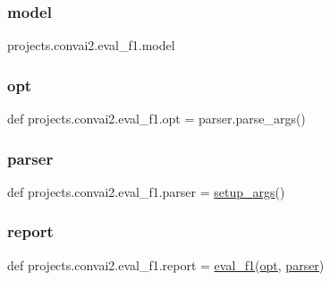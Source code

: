 \subsubsection{\texorpdfstring{model}{model}}
{\footnotesize\ttfamily projects.\+convai2.\+eval\+\_\+f1.\+model}

\mbox{\label{namespaceprojects_1_1convai2_1_1eval__f1_a57ea0872105b4863c523331ade8a705e}} 
\subsubsection{\texorpdfstring{opt}{opt}}
{\footnotesize\ttfamily def projects.\+convai2.\+eval\+\_\+f1.\+opt = parser.\+parse\+\_\+args()}

\mbox{\label{namespaceprojects_1_1convai2_1_1eval__f1_a6da11294e7d2ac208d4069e4b4edfe72}} 
\subsubsection{\texorpdfstring{parser}{parser}}
{\footnotesize\ttfamily def projects.\+convai2.\+eval\+\_\+f1.\+parser = \hyperlink{namespaceprojects_1_1convai2_1_1eval__f1_a74826f78ce1ce6c9fe9b6d4a6297f3bd}{setup\+\_\+args}()}

\mbox{\label{namespaceprojects_1_1convai2_1_1eval__f1_ac8a7730e4bd30a9a12a7f83c3b6821fd}} 
\subsubsection{\texorpdfstring{report}{report}}
{\footnotesize\ttfamily def projects.\+convai2.\+eval\+\_\+f1.\+report = \hyperlink{namespaceprojects_1_1convai2_1_1eval__f1_aac16a2ead8ff2b896c82411fe262f449}{eval\+\_\+f1}(\hyperlink{namespaceprojects_1_1convai2_1_1eval__f1_a57ea0872105b4863c523331ade8a705e}{opt}, \hyperlink{namespaceprojects_1_1convai2_1_1eval__f1_a6da11294e7d2ac208d4069e4b4edfe72}{parser})}

